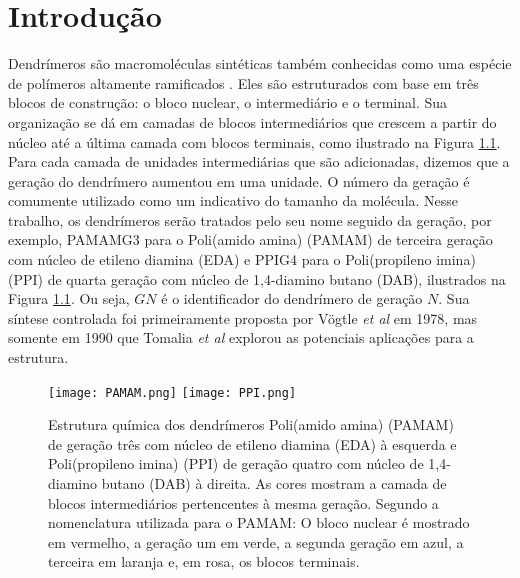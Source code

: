 \chapter{Introdução}

Dendrímeros são macromoléculas sintéticas também conhecidas como uma espécie de polímeros altamente ramificados \cite{Vogtle2000}.
Eles são estruturados com base em três blocos de construção: o bloco nuclear, o intermediário e o terminal.
Sua organização se dá em camadas de blocos intermediários que crescem a partir do núcleo até a última camada com blocos terminais, como ilustrado na Figura \ref{PAMAMPPI}.
Para cada camada de unidades intermediárias que são adicionadas, dizemos que a geração do dendrímero aumentou em uma unidade.
O número da geração é comumente utilizado como um indicativo do tamanho da molécula\cite{Tomalia1990}.
Nesse trabalho, os dendrímeros serão tratados pelo seu nome seguido da geração, por exemplo, PAMAMG3 para o Poli(amido amina) (PAMAM) de terceira geração com núcleo de etileno diamina (EDA) e PPIG4 para o Poli(propileno imina) (PPI) de quarta geração com núcleo de 1,4-diamino butano (DAB), ilustrados na Figura \ref{PAMAMPPI}.
Ou seja, $GN$ é o identificador do dendrímero de geração $N$.
Sua síntese controlada foi primeiramente proposta por Vögtle \textit{et al}\cite{Vogtle1978} em 1978, mas somente em 1990 que Tomalia \textit{et al}\cite{Tomalia1990} explorou as potenciais aplicações para a estrutura.


\begin{figure}[ht!]
\centering
\texttt{[image: PAMAM.png]}
\texttt{[image: PPI.png]}
\caption{Estrutura química dos dendrímeros Poli(amido amina) (PAMAM) de geração três com núcleo de etileno diamina (EDA) à esquerda e Poli(propileno imina) (PPI) de geração quatro com núcleo de 1,4-diamino butano (DAB) à direita. As cores mostram a camada de blocos intermediários pertencentes à mesma geração. Segundo a nomenclatura utilizada para o PAMAM: O bloco nuclear é mostrado em vermelho, a geração um em verde, a segunda geração em azul, a terceira em laranja e, em rosa, os blocos terminais.}
\label{PAMAMPPI}
\end{figure}


